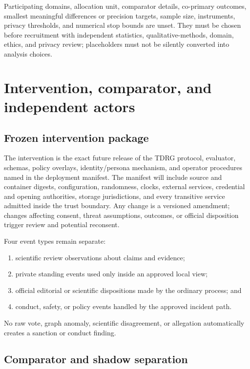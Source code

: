 \documentclass[11pt]{article}
\newcommand{\tdrg}{TDRG}
\begin{document}
\begin{evidencegate}
Participating domains, allocation unit, comparator details, co-primary outcomes,
smallest meaningful differences or precision targets, sample size, instruments,
privacy thresholds, and numerical stop bounds are unset. They must be chosen before
recruitment with independent statistics, qualitative-methods, domain, ethics, and
privacy review; placeholders must not be silently converted into analysis choices.
\end{evidencegate}

\section{Intervention, comparator, and independent actors}

\subsection{Frozen intervention package}

The intervention is the exact future release of the \tdrg{} protocol, evaluator,
schemas, policy overlays, identity/persona mechanism, and operator procedures
named in the deployment manifest. The manifest will include source and container
digests, configuration, randomness, clocks, external services, credential and
opening authorities, storage jurisdictions, and every transitive service admitted
inside the trust boundary. Any change is a versioned amendment; changes affecting
consent, threat assumptions, outcomes, or official disposition trigger review and
potential reconsent.

Four event types remain separate:
\begin{enumerate}
  \item scientific review observations about claims and evidence;
  \item private standing events used only inside an approved local view;
  \item official editorial or scientific dispositions made by the ordinary
  process; and
  \item conduct, safety, or policy events handled by the approved incident path.
\end{enumerate}
No raw vote, graph anomaly, scientific disagreement, or allegation automatically
creates a sanction or conduct finding.

\subsection{Comparator and shadow separation}
\end{document}
